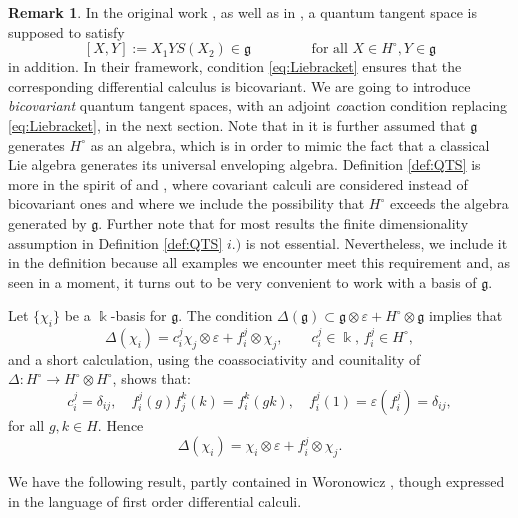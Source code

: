 \documentclass{article}
\theoremstyle{definition}
\newtheorem{remark}[thm]{Remark}
\newcommand{\de}{{\delta}}
\newcommand{\fg}{{\mathfrak{g}}}
\newcommand{\beq}{\begin{equation}}
\newcommand{\eeq}{\end{equation}}
\begin{document}
	\begin{remark}
		In the original work \cite[Section 5]{Woronowicz1989}, as well as in \cite[Section 2.3.1]{AschieriThesis}, a quantum tangent space is supposed to satisfy 
		\begin{equation}\label{eq:Liebracket}
			[X,Y]:=X_1YS(X_2)\in\mathfrak{g}\qquad\qquad\text{ for all }X\in H^\circ,Y\in\mathfrak{g}
		\end{equation}
		in addition. In their framework, condition \eqref{eq:Liebracket} ensures that the corresponding differential calculus is bicovariant. We are going to introduce \textit{bicovariant} quantum tangent spaces, with an adjoint \textit{co}action condition replacing \eqref{eq:Liebracket}, in the next section.
		Note that in \cite{AschieriThesis,AschieriSchupp} it is further assumed that $\mathfrak{g}$ generates $H^\circ$ as an algebra, which is in order to mimic the fact that a classical Lie algebra generates its universal enveloping algebra. Definition \ref{def:QTS} is more in the spirit of \cite{HeckKolb} and \cite[Section 14.1.2]{ks}, where covariant calculi are considered instead of bicovariant ones and where we include the possibility that $H^\circ$ exceeds the algebra generated by $\mathfrak{g}$. Further note that for most results the finite dimensionality assumption in Definition \ref{def:QTS} $i.)$ is not essential. Nevertheless, we include it in the definition because all examples we encounter meet this requirement and, as seen in a moment, it turns out to be very convenient to work with a basis of $\mathfrak{g}$.
	\end{remark}
	
	Let $\{\chi_i\}$ be a 
	$\Bbbk$-basis for $\fg$.
	The condition $\Delta(\fg) \subset \fg \otimes\varepsilon+H^\circ \otimes \fg$ implies
	that
	$$
	\Delta(\chi_i)=c^j_i \chi_j \otimes \varepsilon+ f^j_i \otimes \chi_j, \qquad c^j_i \in \Bbbk, \, f^j_i \in H^\circ,
	$$
	and a short calculation, 
	using the coassociativity and counitality of $\Delta\colon H^\circ\to H^\circ\otimes H^\circ$, shows that:
	\begin{equation}\label{eq:fij}
		c^j_i =\de_{ij}, \quad f_i^j(g)f_j^k(k)=f_i^k(gk), \quad f_i^j(1)=\varepsilon(f_i^j)=\de_{ij},
	\end{equation}
	for all $g,k\in H$. Hence
	\beq\label{qu-plane}
	\Delta(\chi_i)=\chi_i \otimes \varepsilon+ f^j_i \otimes \chi_j.
	\eeq
	
	
	\medskip
	We have the following result, partly contained 
	in Woronowicz \cite[Section 5]{Woronowicz1989}, though expressed in the language of first order differential calculi.
	
\end{document}
